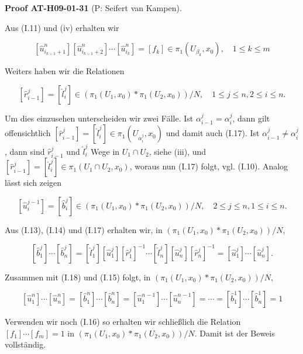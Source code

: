 \documentclass[10pt, letterpaper]{article}
\newcommand{\CustomHeading}[3]{%
  \par\medskip\noindent%
  \textbf{#1 #2} \textnormal{(#3)}.\enskip%
}
\newenvironment{PROOF}[2]{\begin{unitbox}\CustomHeading{Proof}{#1}{#2}}{\end{unitbox}}
\begin{document}
\begin{PROOF}{AT-H09-01-31}{P: Seifert van Kampen}
Aus (I.11) und (iv) erhalten wir

$$
\left[\hat{u}_{i_{k-1}+1}^n\right]\left[\hat{u}_{i_{k-1}+2}^n\right] \cdots\left[\hat{u}_{i_k}^n\right]=\left[f_k\right] \in \pi_1\left(U_{\beta_k}, x_0\right), \quad 1 \leq k \leq m
$$


Weiters haben wir die Relationen

$$
\left[\hat{r}_{i-1}^j\right]=\left[\hat{l}_i^j\right] \in\left(\pi_1\left(U_1, x_0\right) * \pi_1\left(U_2, x_0\right)\right) / N, \quad 1 \leq j \leq n, 2 \leq i \leq n .
$$


Um dies einzusehen unterscheiden wir zwei Fälle. Ist $\alpha_{i-1}^j=\alpha_i^j$, dann gilt offensichtlich $\left[\hat{r}_{i-1}^j\right]=\left[\hat{l}_i^j\right] \in \pi_1\left(U_{\alpha_i^j}, x_0\right)$ und damit auch (I.17). Ist $\alpha_{i-1}^j \neq \alpha_i^j$, dann sind $\hat{r}_{i-1}^j$ und $\hat{l}_i^j$ Wege in $U_1 \cap U_2$, siehe (iii), und $\left[\hat{r}_{i-1}^j\right]=\left[\hat{l}_i^j\right] \in \pi_1\left(U_1 \cap U_2, x_0\right)$, woraus nun (I.17) folgt, vgl. (I.10). Analog lässt sich zeigen

$$
\left[\hat{u}_i^{j-1}\right]=\left[\hat{b}_i^j\right] \in\left(\pi_1\left(U_1, x_0\right) * \pi_1\left(U_2, x_0\right)\right) / N, \quad 2 \leq j \leq n, 1 \leq i \leq n .
$$


Aus (I.13), (I.14) und (I.17) erhalten wir, in $\left(\pi_1\left(U_1, x_0\right) * \pi_1\left(U_2, x_0\right)\right) / N$,

$$
\left[\hat{b}_1^j\right] \cdots\left[\hat{b}_n^j\right]=\left[\hat{l}_1^j\right]\left[\hat{u}_1^j\right]\left[\hat{r}_1^j\right]^{-1} \cdots\left[\hat{l}_n^j\right]\left[\hat{u}_n^j\right]\left[\hat{r}_n^j\right]^{-1}=\left[\hat{u}_1^j\right] \cdots\left[\hat{u}_n^j\right] .
$$


Zusammen mit (I.18) und (I.15) folgt, in $\left(\pi_1\left(U_1, x_0\right) * \pi_1\left(U_2, x_0\right)\right) / N$,

$$
\left[\hat{u}_1^n\right] \cdots\left[\hat{u}_n^n\right]=\left[\hat{b}_1^n\right] \cdots\left[\hat{b}_n^n\right]=\left[\hat{u}_1^{n-1}\right] \cdots\left[\hat{u}_n^{n-1}\right]=\cdots=\left[\hat{b}_1^1\right] \cdots\left[\hat{b}_n^1\right]=1
$$


Verwenden wir noch (I.16) so erhalten wir schließlich die Relation $\left[f_1\right] \cdots\left[f_m\right]=1$ in $\left(\pi_1\left(U_1, x_0\right) * \pi_1\left(U_2, x_0\right)\right) / N$. Damit ist der Beweis vollständig.
\end{PROOF}
\end{document}
